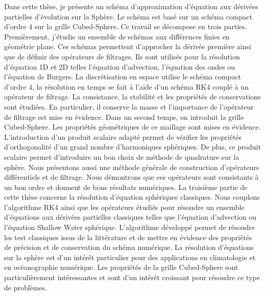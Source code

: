 \documentclass[11pt]{thesul}
\begin{document}
\NumberAbstractPages
\begin{ThesisAbstract}
  \begin{FrenchAbstract}
    Dans cette thèse, je présente un schéma d'approximation d’équation aux dérivées partielles d’évolution sur la Sphère. Le schéma est basé sur un schéma compact d'ordre 4 sur la grille Cubed-Sphere. Ce travail se décompose en trois parties.
    Premièrement, j'étudie un ensemble de schémas aux différences finies en géométrie plane. Ces schémas permettent d'approcher la dérivée première ainsi que de définir des opérateurs de filtrages. Ils sont utilisés pour la résolution d'équation 1D et 2D telles l'équation d'advection, l'équation des ondes ou l'équation de Burgers. La discrétisation en espace utilise le schéma compact d'ordre 4, la résolution en temps se fait à l'aide d'un schéma RK4 couplé à un opérateur de filtrage. La consistance, la stabilité et les propriétés de conservations sont étudiées. En particulier, il conserve la masse et l'importance de l'opérateur de filtrage est mise en évidence.
    Dans  un second temps, on introduit la grille Cubed-Sphere. Les propriétés géométriques de ce maillage sont mises en évidence. L'introduction d'un produit scalaire adapté permet de vérifier les propriétés d'orthogonalité d'un grand nombre d'harmoniques sphériques. De plus, ce produit scalaire permet d'introduire un bon choix de méthode de quadrature sur la sphère. Nous présentons aussi une méthode générale de construction d'opérateurs différentiels et de filtrage. Nous démontrons que ces opérateurs sont consistants à un bon ordre et donnent de bons résultats numériques.
    La troisième partie de cette thèse concerne la résolution d'équation sphèriques classiques. Nous couplons l'algorithme RK4 ainsi que les opérateurs étudiés pour résoudre un ensemble d'équations aux dérivées partielles classiques telles que l'équation d'advection ou l'équation Shallow Water sphérique. L'algorithme développé permet de résoudre les test classiques issus de la littérature et de mettre en évidence des propriétés de précision et de conservation du schéma numérique.
    La résolution d'équations sur la sphère est d'un intérêt particulier pour des applications en climatologie et en océanographie numérique. Les propriétés de la grille Cubed-Sphere sont particulièrement intéressantes et sont d'un intérêt croissant pour résoudre ce type de problèmes.
  \end{FrenchAbstract}
  \begin{EnglishAbstract}

\end{EnglishAbstract}
\end{ThesisAbstract}
\end{document}

